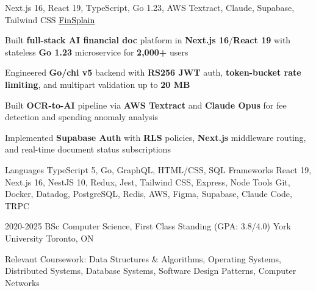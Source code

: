 \documentclass[11pt, a4paper]{awesome-cv}
\begin{document}
\begin{cventries}
\end{cventries}


\begin{cventries}
  \cventry
  {Next.js 16, React 19, TypeScript, Go 1.23, AWS Textract, Claude, Supabase, Tailwind CSS}
  {\href{https://finsplain.net}{\textcolor{black}{\underline{FinSplain}} \faExternalLink}}
  {}
  {}
  {
    \begin{cvitems}
      \item {Built \textbf{full-stack AI financial doc} platform in \textbf{Next.js 16}/\textbf{React 19} with stateless \textbf{Go 1.23} microservice for \textbf{2,000+} users}
      \item {Engineered \textbf{Go/chi v5} backend with \textbf{RS256 JWT} auth, \textbf{token-bucket rate limiting}, and multipart validation up to \textbf{20 MB}}
      \item {Built \textbf{OCR-to-AI} pipeline via \textbf{AWS Textract} and \textbf{Claude Opus} for fee detection and spending anomaly analysis}
      \item {Implemented \textbf{Supabase Auth} with \textbf{RLS} policies, \textbf{Next.js} middleware routing, and real-time document status subscriptions}
    \end{cvitems}
  }
\end{cventries}


\begin{cvskills}
  \cvskill
  {Languages}
  {TypeScript 5, Go, GraphQL, HTML/CSS, SQL}
  \cvskill
  {Frameworks}
  {React 19, Next.js 16, NestJS 10, Redux, Jest, Tailwind CSS, Express, Node}
  \cvskill
  {Tools}
  {Git, Docker, Datadog, PostgreSQL, Redis, AWS, Figma, Supabase, Claude Code, TRPC}
\end{cvskills}

\vspace{-2mm}

\begin{cventries}
  \cventry
  {2020-2025}
  {BSc Computer Science, First Class Standing (GPA: 3.8/4.0)}
  {York University}
  {Toronto, ON}
  {%
    \begin{cvitems}
      \item {Relevant Coursework: Data Structures \& Algorithms, Operating Systems, Distributed Systems, Database Systems, Software Design Patterns, Computer Networks}
    \end{cvitems}
  }
\end{cventries}
\end{document}
